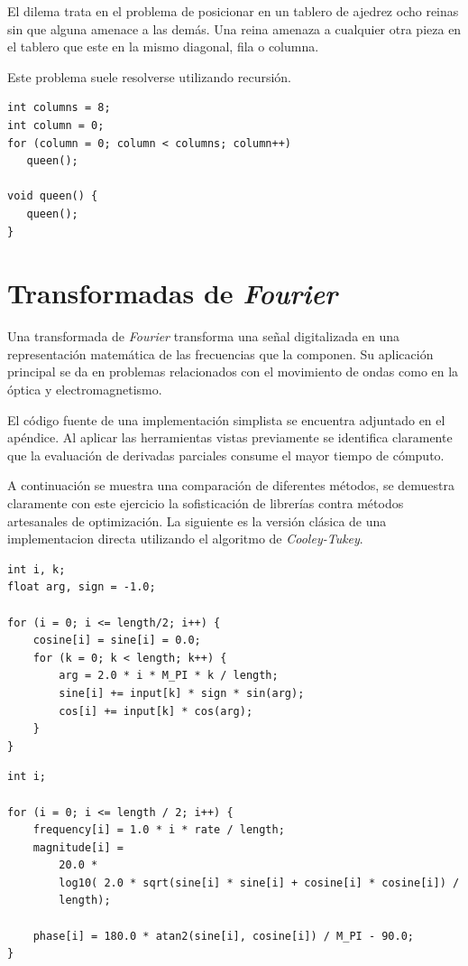 \documentclass[a4paper]{report}
\begin{document}
El dilema trata en el problema de posicionar en un tablero de ajedrez ocho
reinas sin que alguna amenace a las dem\'as. Una reina amenaza a cualquier otra
pieza en el tablero que este en la mismo diagonal, fila o columna.

\bigskip

Este problema suele resolverse utilizando recursi\'on.

\begin{verbatim}
int columns = 8;
int column = 0;
for (column = 0; column < columns; column++)
   queen();

void queen() {
   queen();
}
\end{verbatim}

\section{Transformadas de {\it Fourier}}

Una transformada de {\it Fourier} \cite{fourier} transforma una se\~nal
digitalizada en una representaci\'on matem\'atica de las frecuencias que la
componen. Su aplicaci\'on principal se da en problemas relacionados con el
movimiento de ondas como en la \'optica y electromagnetismo.

\bigskip

El c\'odigo fuente de una implementaci\'on simplista se encuentra adjuntado en
el ap\'endice. Al aplicar las herramientas vistas previamente se identifica
claramente que la evaluaci\'on de derivadas parciales consume el mayor tiempo
de c\'omputo.

\bigskip

A continuaci\'on se muestra una comparaci\'on de diferentes m\'etodos, se
demuestra claramente con este ejercicio la sofisticaci\'on de librer\'ias
contra m\'etodos artesanales de optimizaci\'on. La siguiente es la versi\'on
cl\'asica de una implementacion directa utilizando el algoritmo de
{\it Cooley-Tukey}.

\begin{verbatim}
int i, k;
float arg, sign = -1.0;

for (i = 0; i <= length/2; i++) {
    cosine[i] = sine[i] = 0.0;
    for (k = 0; k < length; k++) {
        arg = 2.0 * i * M_PI * k / length;
        sine[i] += input[k] * sign * sin(arg);
        cos[i] += input[k] * cos(arg);
    }
}
\end{verbatim}

\begin{verbatim}
int i;

for (i = 0; i <= length / 2; i++) {
    frequency[i] = 1.0 * i * rate / length;
    magnitude[i] =
        20.0 *
        log10( 2.0 * sqrt(sine[i] * sine[i] + cosine[i] * cosine[i]) /
        length);

    phase[i] = 180.0 * atan2(sine[i], cosine[i]) / M_PI - 90.0;
}
\end{verbatim}
\end{document}
